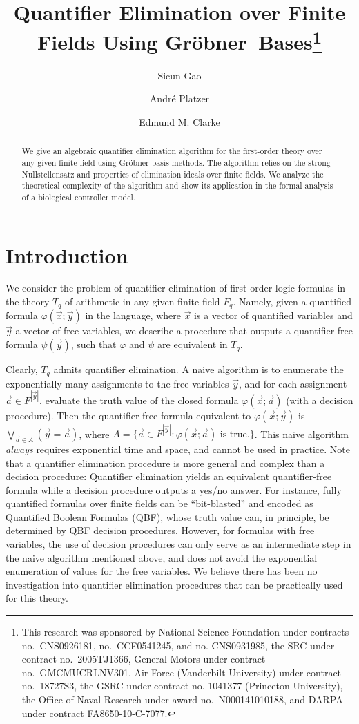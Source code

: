 \documentclass[envcountsect]{llncs}
\title{Quantifier Elimination over Finite Fields Using Gr\"obner~Bases\thanks{This research was sponsored by National Science
   Foundation under contracts no.~CNS0926181,
   no.~CCF0541245, and no. CNS0931985,
   the SRC under contract
   no.~2005TJ1366, General Motors under contract no.~GMCMUCRLNV301, Air 
Force
   (Vanderbilt University) under contract
   no.~18727S3, the GSRC under contract no. 1041377 
(Princeton University), the Office of Naval Research under award 
no.~N000141010188, and DARPA under contract FA8650-10-C-7077.
}}
\author{Sicun Gao\and Andr\'e Platzer \and Edmund M. Clarke }
\institute{Carnegie Mellon University, Pittsburgh, PA, USA}
\begin{document}
\maketitle
\begin{abstract} 
We give an algebraic quantifier elimination algorithm for the first-order theory over any given finite field using Gr\"obner basis methods. The algorithm relies on the strong Nullstellensatz and properties of elimination ideals over finite fields. We analyze the theoretical complexity of the algorithm and show its application in the formal analysis of a biological controller model.
\end{abstract}

\section{Introduction}

We consider the problem of quantifier elimination of first-order logic formulas in the theory $T_q$ of arithmetic in any given finite field $F_q$. Namely, given a quantified formula $\varphi(\vec x;\vec y)$ in the language, where $\vec x$ is a vector of quantified variables and $\vec y$ a vector of free variables, we describe a procedure that outputs a quantifier-free formula $\psi(\vec y)$, such that $\varphi$ and $\psi$ are equivalent in $T_q$. 

Clearly, $T_q$ admits quantifier elimination. A naive algorithm is to enumerate the exponentially many assignments to the free variables $\vec y$, and for each assignment $\vec a\in F^{|\vec y|}$, evaluate the truth value of the closed formula $\varphi(\vec x;\vec a)$ (with a decision procedure). Then the quantifier-free formula equivalent to $\varphi(\vec x;\vec y)$ is $\bigvee_{\vec a\in A}(\vec y = \vec a)$, where $A=\{\vec a\in F^{|\vec y|}: \varphi(\vec x;\vec a) \mbox{ is true.}\}$. This naive algorithm {\em always} requires exponential time and space, and cannot be used in practice. Note that a quantifier elimination procedure is more general and complex than a decision procedure: Quantifier elimination yields an equivalent quantifier-free formula  while a decision procedure outputs a yes/no answer. For instance, fully quantified formulas over finite fields can be ``bit-blasted'' and encoded as Quantified Boolean Formulas (QBF), whose truth value can, in principle, be determined by QBF decision procedures. However, for formulas with free variables, the use of decision procedures can only serve as an intermediate step in the naive algorithm mentioned above, and does not avoid the exponential enumeration of values for the free variables. We believe there has been no investigation into quantifier elimination procedures that can be practically used for this theory. 
\end{document}
